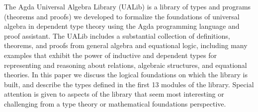 The Agda Universal Algebra Library (UALib) is a library of types and programs
(theorems and proofs) we developed to formalize the foundations of universal
algebra in dependent type theory using the Agda programming language and proof
assistant.
The UALib includes a substantial collection of definitions, theorems, and proofs
from general algebra and equational logic, including many examples that exhibit
the power of inductive and dependent types for representing and reasoning about
relations, algebraic structures, and equational theories.
In this paper we discuss the logical foundations on which the library is built,
and describe the types defined in the first 13 modules of the library. Special
attention is given to aspects of the library that seem most interesting or
challenging from a type theory or mathematical foundations perspective.